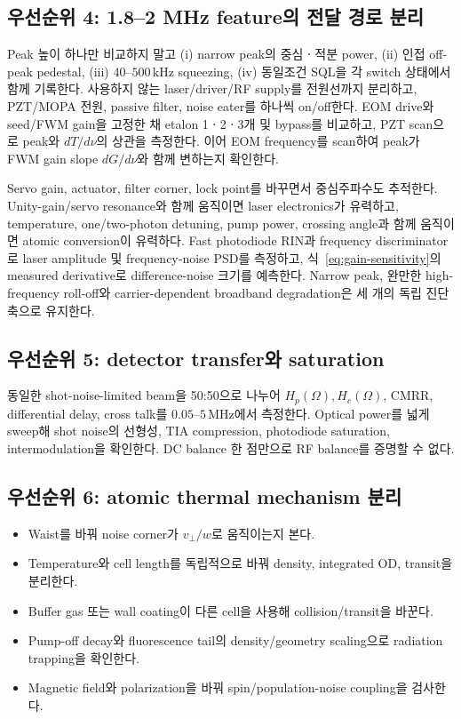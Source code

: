 \documentclass[11pt,a4paper]{article}
\newcommand{\MHz}{\,\mathrm{MHz}}
\newcommand{\kHz}{\,\mathrm{kHz}}
\begin{document}
\subsection{우선순위 4: 1.8--2 MHz feature의 전달 경로 분리}

Peak 높이 하나만 비교하지 말고 (i) narrow peak의 중심ㆍ적분 power, (ii) 인접
off-peak pedestal, (iii) $40$--$500\kHz$ squeezing, (iv) 동일조건 SQL을 각 switch
상태에서 함께 기록한다. 사용하지 않는 laser/driver/RF supply를 전원선까지 분리하고,
PZT/MOPA 전원, passive filter, noise eater를 하나씩 on/off한다. EOM drive와 seed/FWM
gain을 고정한 채 etalon 1ㆍ2ㆍ3개 및 bypass를 비교하고, PZT scan으로 peak와
$dT/d\nu$의 상관을 측정한다. 이어 EOM frequency를 scan하여 peak가 FWM gain slope
$dG/d\nu$와 함께 변하는지 확인한다\cite{ExperimentLog20260713}.

Servo gain, actuator, filter corner, lock point를 바꾸면서 중심주파수도 추적한다.
Unity-gain/servo resonance와 함께 움직이면 laser electronics가 유력하고, temperature,
one/two-photon detuning, pump power, crossing angle과 함께 움직이면 atomic conversion이
유력하다. Fast photodiode RIN과 frequency discriminator로 laser amplitude 및
frequency-noise PSD를 측정하고, 식~\eqref{eq:gain-sensitivity}의 measured derivative로
difference-noise 크기를 예측한다. Narrow peak, 완만한 high-frequency roll-off와
carrier-dependent broadband degradation은 세 개의 독립 진단축으로 유지한다.

\subsection{우선순위 5: detector transfer와 saturation}

동일한 shot-noise-limited beam을 50:50으로 나누어
$H_p(\Omega),H_c(\Omega)$, CMRR, differential delay, cross talk를
$0.05$--$5\MHz$에서 측정한다. Optical power를 넓게 sweep해 shot noise의 선형성,
TIA compression, photodiode saturation, intermodulation을 확인한다. DC balance 한
점만으로 RF balance를 증명할 수 없다.

\subsection{우선순위 6: atomic thermal mechanism 분리}

\begin{itemize}
\item Waist를 바꿔 noise corner가 $v_\perp/w$로 움직이는지 본다.
\item Temperature와 cell length를 독립적으로 바꿔 density, integrated OD, transit을
분리한다.
\item Buffer gas 또는 wall coating이 다른 cell을 사용해 collision/transit을 바꾼다.
\item Pump-off decay와 fluorescence tail의 density/geometry scaling으로 radiation
trapping을 확인한다.
\item Magnetic field와 polarization을 바꿔 spin/population-noise coupling을 검사한다.
\end{itemize}
\end{document}
